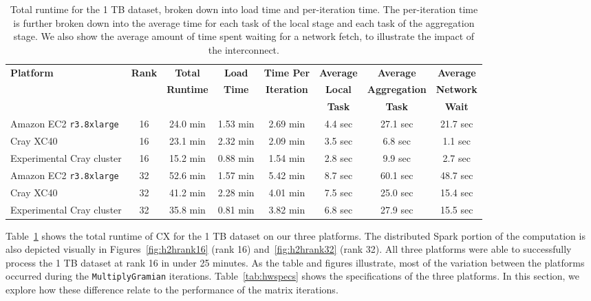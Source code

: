     \begin{table}
    \begin{center}
    \begin{tabular}{| l | c | c | c | c | c | c | c |}
    \toprule
    \textbf{Platform} & \textbf{Rank} & \textbf{Total} & \textbf{Load} & \textbf{Time Per} & \textbf{Average} & \textbf{Average} & \textbf{Average} \\
                               & & \textbf{Runtime} & \textbf{Time} & \textbf{Iteration} & \textbf{Local} & \textbf{Aggregation} & \textbf{Network} \\
                               & & & & & \textbf{Task} & \textbf{Task} & \textbf{Wait} \\
    \midrule
    Amazon EC2 \texttt{r3.8xlarge} & 16 & 24.0 min & 1.53 min & 2.69 min & 4.4 sec & 27.1 sec & 21.7 sec \\
    \midrule
    Cray XC40 & 16 & 23.1 min& 2.32 min & 2.09 min &  3.5 sec & 6.8 sec & 1.1 sec \\
    \midrule
    Experimental Cray cluster & 16 & 15.2 min & 0.88 min & 1.54 min &  2.8 sec & 9.9 sec & 2.7 sec \\
    \midrule
    Amazon EC2 \texttt{r3.8xlarge} & 32 & 52.6 min& 1.57 min & 5.42 min &  8.7 sec & 60.1 sec & 48.7 sec \\
    \midrule
    Cray XC40 & 32 & 41.2 min & 2.28 min & 4.01 min &  7.5 sec & 25.0 sec & 15.4 sec \\
    \midrule
   Experimental Cray cluster & 32 & 35.8 min & 0.81 min & 3.82 min &  6.8 sec & 27.9 sec & 15.5 sec \\
   \bottomrule
    \end{tabular}
    \end{center}
    \caption{Total runtime for the 1 TB dataset, broken down into load time and per-iteration time. The per-iteration time is further broken down into the average time for each task of the local stage and each task of the aggregation stage.  We also show the average amount of time spent waiting for a network fetch, to illustrate the impact of the interconnect.}
    \label{tab:h2hres1TB}
    \end{table}
    
Table~\ref{tab:h2hres1TB} shows the total runtime of CX for the 1 TB dataset on our three platforms.  The distributed Spark portion of the computation is also depicted visually in Figures~\ref{fig:h2hrank16} (rank 16) and~\ref{fig:h2hrank32} (rank 32).  All three platforms were able to successfully process the 1 TB dataset at rank 16 in under 25 minutes.  As the table and figures illustrate, most of the variation between the platforms occurred during the \texttt{MultiplyGramian} iterations.  Table~\ref{tab:hwspecs} shows the specifications of the three platforms. In this section, we explore how these difference relate to the performance of the matrix iterations.

